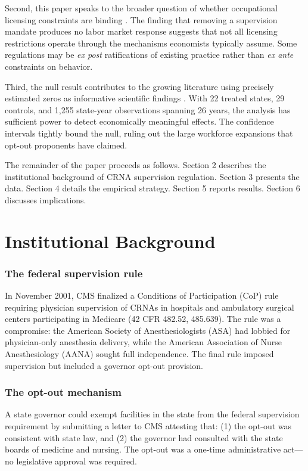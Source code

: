 \documentclass[12pt]{article}
\begin{document}
Second, this paper speaks to the broader question of whether occupational licensing constraints are binding \citep{kleiner2006licensing, johnson2018regulation}. The finding that removing a supervision mandate produces no labor market response suggests that not all licensing restrictions operate through the mechanisms economists typically assume. Some regulations may be \emph{ex post} ratifications of existing practice rather than \emph{ex ante} constraints on behavior.

Third, the null result contributes to the growing literature using precisely estimated zeros as informative scientific findings \citep{abadie2020statistical}. With 22 treated states, 29 controls, and 1,255 state-year observations spanning 26 years, the analysis has sufficient power to detect economically meaningful effects. The confidence intervals tightly bound the null, ruling out the large workforce expansions that opt-out proponents have claimed.

The remainder of the paper proceeds as follows. Section 2 describes the institutional background of CRNA supervision regulation. Section 3 presents the data. Section 4 details the empirical strategy. Section 5 reports results. Section 6 discusses implications.


\section{Institutional Background}

\subsubsection*{The federal supervision rule} In November 2001, CMS finalized a Conditions of Participation (CoP) rule requiring physician supervision of CRNAs in hospitals and ambulatory surgical centers participating in Medicare (42 CFR 482.52, 485.639). The rule was a compromise: the American Society of Anesthesiologists (ASA) had lobbied for physician-only anesthesia delivery, while the American Association of Nurse Anesthesiology (AANA) sought full independence. The final rule imposed supervision but included a governor opt-out provision.

\subsubsection*{The opt-out mechanism} A state governor could exempt facilities in the state from the federal supervision requirement by submitting a letter to CMS attesting that: (1) the opt-out was consistent with state law, and (2) the governor had consulted with the state boards of medicine and nursing. The opt-out was a one-time administrative act---no legislative approval was required.
\end{document}

